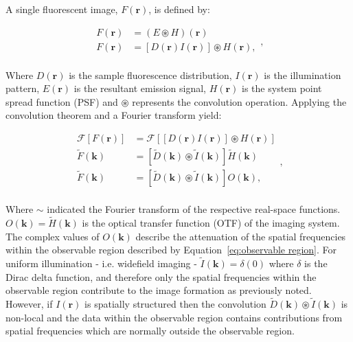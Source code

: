 A single fluorescent image, $F(\textbf{r})$, is defined by:

\begin{equation}\label{eq:fluorescent_image}
\begin{split}
F(\textbf{r}) &= (E \circledast H)(\textbf{r})\\
F(\textbf{r}) &= [D(\textbf{r})I(\textbf{r})] \circledast H(\textbf{r}),\\
\end{split},
\end{equation}

Where $D(\textbf{r})$ is the sample fluorescence distribution, 
$I(\textbf{r})$ is the illumination pattern, $E(\textbf{r})$ is the resultant 
emission signal, $H(\textbf{r})$ is the system point spread function (PSF) 
and $\circledast$ represents the convolution operation. Applying the 
convolution theorem and a Fourier transform yield:

\begin{equation}\label{eq:SIM_fluorescent_image_fourier}
\begin{split}
\mathcal{F}\left[F(\textbf{r})\right] &= \mathcal{F}\left[\left[D(\textbf{r})I(\textbf{r})\right] \circledast H(\textbf{r})\right]\\
\tilde{F}(\textbf{k}) &= \left[\tilde{D}(\textbf{k})\circledast \tilde{I}(\textbf{k})\right] \tilde{H}(\textbf{k})\\
\tilde{F}(\textbf{k}) &= \left[\tilde{D}(\textbf{k})\circledast \tilde{I}(\textbf{k})\right] O(\textbf{k}),\\
\end{split},
\end{equation}

Where $\sim$ indicated the Fourier transform of the respective real-space
functions. $O(\textbf{k}) = \tilde{H}(\textbf{k})$ is the optical transfer
function (OTF) of the imaging system. The complex values of $O(\textbf{k})$
describe the attenuation of the spatial frequencies within the observable 
region described by Equation~\ref{eq:observable region}. For uniform 
illumination - i.e. widefield imaging - $\tilde{I}(\textbf{k}) = \delta(0)$ 
where $\delta$ is the Dirac delta function, and therefore only the spatial 
frequencies within the observable region contribute to the image formation as 
previously noted.  However, if $I(\textbf{r})$ is spatially structured then 
the convolution $\tilde{D}(\textbf{k})\circledast \tilde{I}(\textbf{k})$ is 
non-local and the  data within the observable region contains contributions 
from spatial frequencies which are normally outside the observable region.

